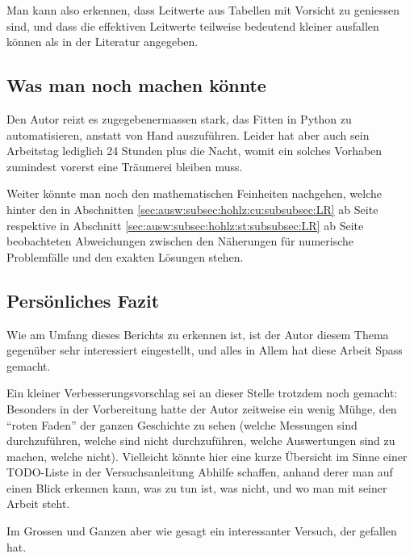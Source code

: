 Man kann also erkennen, dass Leitwerte  aus Tabellen mit Vorsicht zu geniessen
sind, und dass die effektiven  Leitwerte teilweise bedeutend kleiner ausfallen
k\"onnen als in der Literatur angegeben.


\subsection{Was man noch machen k\"onnte}
\label{sec:results:subsec:whatnext}

Den  Autor  reizt  es  zugegebenermassen   stark,  das  Fitten  in  Python  zu
automatisieren,  anstatt von  Hand  auszuf\"uhren. Leider hat  aber auch  sein
Arbeitstag lediglich  24 Stunden  plus die Nacht,  womit ein  solches Vorhaben
zumindest vorerst eine Tr\"aumerei bleiben muss.


Weiter  k\"onnte  man noch  den  mathematischen  Feinheiten nachgehen,  welche
hinter   den    in   Abschnitten   \ref{sec:ausw:subsec:hohlz:cu:subsubsec:LR}
ab     Seite    \pageref{sec:ausw:subsec:hohlz:cu:subsubsec:LR}     respektive
in    Abschnitt     \ref{sec:ausw:subsec:hohlz:st:subsubsec:LR}    ab    Seite
\pageref{sec:ausw:subsec:hohlz:st:subsubsec:LR}    beobachteten   Abweichungen
zwischen  den N\"aherungen  f\"ur  numerische Problemf\"alle  und den  exakten
L\"osungen stehen.


\clearpage
\subsection{Pers\"onliches Fazit}
\label{sec:results:subsec:thoughts}


Wie am  Umfang dieses  Berichts zu  erkennen ist, ist  der Autor  diesem Thema
gegen\"uber sehr interessiert eingestellt, und alles in Allem hat diese Arbeit
Spass gemacht.


Ein  kleiner  Verbesserungsvorschlag  sei   an  dieser  Stelle  trotzdem  noch
gemacht: Besonders in  der Vorbereitung  hatte der  Autor zeitweise  ein wenig
M\"uhge, den ``roten Faden'' der  ganzen Geschichte zu sehen (welche Messungen
sind durchzuf\"uhren,  welche sind nicht durchzuf\"uhren,  welche Auswertungen
sind zu machen, welche nicht). Vielleicht k\"onnte hier eine kurze \"Ubersicht
im Sinne  einer TODO-Liste in  der Versuchsanleitung Abhilfe  schaffen, anhand
derer man auf einen Blick erkennen kann, was zu tun ist, was nicht, und wo man
mit seiner Arbeit steht.


Im Grossen und Ganzen aber wie  gesagt ein interessanter Versuch, der gefallen
hat.
